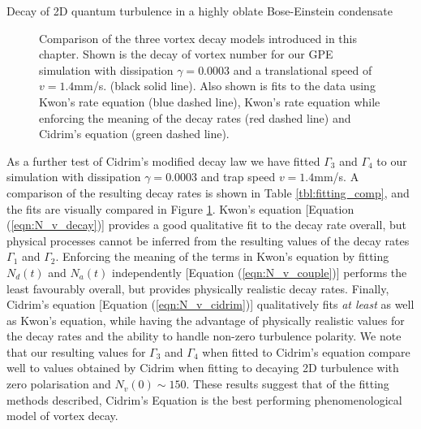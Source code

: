 \begin{chapter}{\label{cha:shin}Decay of 2D quantum turbulence in a highly oblate Bose-Einstein condensate}
\begin{figure}
\begin{center}
\end{center}
\caption{\label{fig:fitting_comp} Comparison of the three vortex decay models introduced in this chapter. Shown is the decay of vortex number for our GPE simulation with dissipation $\gamma=0.0003$ and a translational speed of $v=1.4$mm/s. (black solid line). Also shown is fits to the data using Kwon's rate equation (blue dashed line), Kwon's rate equation while enforcing the meaning of the decay rates (red dashed line) and Cidrim's equation (green dashed line).}
\end{figure}

As a further test of Cidrim's modified decay law we have fitted $\Gamma_3$ and $\Gamma_4$ to our simulation with dissipation $\gamma=0.0003$ and trap speed $v=1.4$mm/s. A comparison of the resulting decay rates is shown in Table \ref{tbl:fitting_comp}, and the fits are visually compared in Figure \ref{fig:fitting_comp}. Kwon's equation [Equation (\ref{eqn:N_v_decay})] provides a good qualitative fit to the decay rate overall, but physical processes cannot be inferred from the resulting values of the decay rates $\Gamma_1$ and $\Gamma_2$. Enforcing the meaning of the terms in Kwon's equation by fitting $N_d(t)$ and $N_a(t)$ independently [Equation (\ref{eqn:N_v_couple})] performs the least favourably overall, but provides physically realistic decay rates. Finally, Cidrim's equation [Equation (\ref{eqn:N_v_cidrim})] qualitatively fits {\it at least} as well as Kwon's equation, while having the advantage of physically realistic values for the decay rates and the ability to handle non-zero turbulence polarity. We note that our resulting values for $\Gamma_3$ and $\Gamma_4$ when fitted to Cidrim's equation compare well to values obtained by Cidrim \etal when fitting to decaying 2D turbulence with zero polarisation and $N_v(0) \sim 150$. These results suggest that of the fitting methods described, Cidrim's Equation is the best performing phenomenological model of vortex decay.


\end{chapter}
